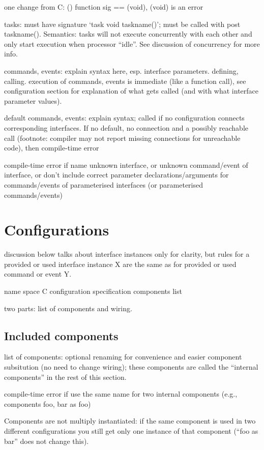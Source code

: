 \documentclass[11pt]{article}
\begin{document}
one change from C: () function sig == (void), (void) is an error

tasks: must have signature `task void taskname()'; must be called with post
taskname(). Semantics: tasks will not execute concurrently with each other
and only start execution when processor ``idle''. See discussion of
concurrency for more info.

commands, events: explain syntax here, esp. interface parameters.
defining, calling. execution of commands, events is immediate (like a
function call), see configuration section for explanation of what gets
called (and with what interface parameter values).

default commands, events: explain syntax; called if no configuration
connects corresponding interfaces. If no default, no connection and a
possibly reachable call (footnote: compiler may not report missing
connections for unreachable code), then compile-time error

compile-time error if name unknown interface, or unknown command/event
of interface, or don't include correct parameter declarations/arguments
for commands/events of parameterised interfaces (or parameterised
commands/events)

\section{Configurations}

discussion below talks about interface instances only for clarity, but
rules for a provided or used interface instance X are the same as for
provided or used command or event Y.

name space
C
configuration specification
components list

two parts: list of components and wiring.

\subsection{Included components}
list of components: optional renaming for convenience and easier component
subsitution (no need to change wiring); these components are called the
``internal components'' in the rest of this section.

compile-time error if use the same name for two internal components (e.g.,
components foo, bar as foo)

Components are not multiply instantiated: if the same component is used
in two different configurations you still get only one instance of that
component (``foo as bar'' does not change this).
\end{document}
